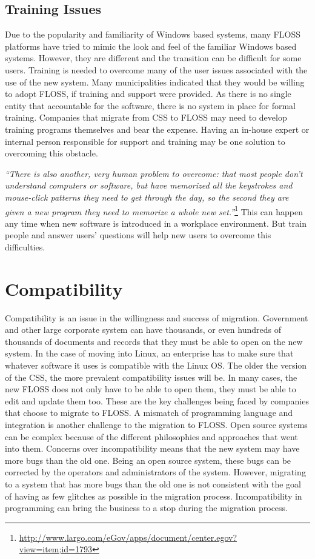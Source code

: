  \subsection{Training Issues}

 Due to the popularity and familiarity of Windows based systems, many FLOSS platforms have tried to mimic the look and feel of the familiar Windows based systems. However, they are different and the transition can be difficult for some users. Training is needed to overcome many of the user issues associated with the use of the new system. Many municipalities indicated that they would be willing to adopt FLOSS, if training and support were provided. As there is no single entity that accountable for the software, there is no system in place for formal training. Companies that migrate from CSS to FLOSS may need to develop training programs themselves and bear the expense. Having an in-house expert or internal person responsible for support and training may be one solution to overcoming this obstacle.
 
\textit{``There is also another, very human problem to overcome: that most people don't understand computers or software, but have memorized all the keystrokes and mouse-click patterns they need to get through the day, so the second they are given a new program they need to memorize a whole new set.''}\footnote{\url{http://www.largo.com/eGov/apps/document/center.egov?view=item;id=1793}} This can happen any time when new software is introduced in a workplace environment. But train people and answer users' questions will help new users to overcome this difficulties.

 \section{Compatibility}
  Compatibility is an issue in the willingness and success of migration. Government and other large corporate system can have thousands, or even hundreds of thousands of documents and records that they must be able to open on the new system. In the case of moving into Linux, an enterprise has to make sure that whatever software it uses is compatible with the Linux OS.
  The older the version of the CSS, the more prevalent compatibility issues will be. In many cases, the new FLOSS does not only have to be able to open them, they must be able to edit and update them too. These are the key challenges being faced by companies that choose to migrate to FLOSS. 
  A mismatch of programming language and integration is another challenge to the migration to FLOSS. Open source systems can be complex because of the different philosophies and approaches that went into them. Concerns over incompatibility means that the new system may have more bugs than the old one. Being an open source system, these bugs can be corrected by the operators and administrators of the system. However, migrating to a system that has more bugs than the old one is not consistent with the goal of having as few glitches as possible in the migration process. Incompatibility in programming can bring the business to a stop during the migration process. 

